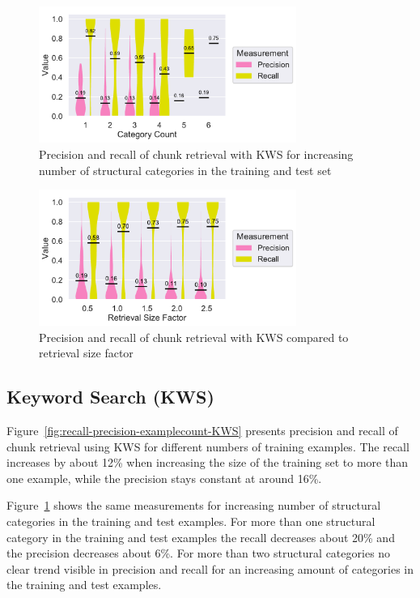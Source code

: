 \documentclass[\myrootdir/main.tex]{subfiles}
\begin{document}
\begin{figure}[htbp]
		\centering
		\includegraphics[width=0.75\textwidth, clip]{img/big-study/recall-precision-categorycount-KWS.pdf}
		\caption{Precision and recall of chunk retrieval with KWS for increasing number of structural categories in the training and test set}
		\label{fig:recall-precision-categorycount-KWS}
\end{figure}

\begin{figure}[htbp]
		\centering
		\includegraphics[width=0.75\textwidth, clip]{img/big-study/contextsizefactor-precision-recall-KWS.pdf}
		\caption{Precision and recall of chunk retrieval with KWS compared to retrieval size factor}
		\label{fig:contextsizefactor-precision-recall-KWS}
\end{figure}

\subsection{Keyword Search (KWS)}
Figure~\ref{fig:recall-precision-examplecount-KWS} presents precision and recall of chunk retrieval using KWS for different numbers of training examples.
The recall increases by about 12\% when increasing the size of the training set to more than one example, while the precision stays constant at around 16\%.

Figure~\ref{fig:recall-precision-categorycount-KWS} shows the same measurements for increasing number of structural categories in the training and test examples.
For more than one structural category in the training and test examples the recall decreases about 20\% and the precision decreases about 6\%.
For more than two structural categories no clear trend visible in precision and recall for an increasing amount of categories in the training and test examples.
\end{document}
